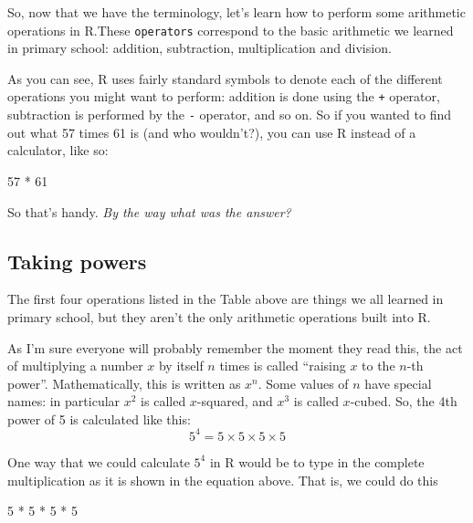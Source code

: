 \documentclass[
]{book}
\newenvironment{Shaded}{\begin{snugshade}}{\end{snugshade}}
\newcommand{\DecValTok}[1]{\textcolor[rgb]{0.00,0.00,0.81}{#1}}
\newcommand{\SpecialCharTok}[1]{\textcolor[rgb]{0.00,0.00,0.00}{#1}}
\begin{document}
So, now that we have the terminology, let's learn how to perform some arithmetic operations in R.These \texttt{operators} correspond to the basic arithmetic we learned in primary school: addition, subtraction, multiplication and division.

As you can see, R uses fairly standard symbols to denote each of the different operations you might want to perform: addition is done using the \texttt{+} operator, subtraction is performed by the \texttt{-} operator, and so on. So if you wanted to find out what 57 times 61 is (and who wouldn't?), you can use R instead of a calculator, like so:

\begin{Shaded}
\begin{Highlighting}[]
\DecValTok{57} \SpecialCharTok{*} \DecValTok{61}
\end{Highlighting}
\end{Shaded}

So that's handy. \emph{By the way what was the answer?}

\hypertarget{taking-powers}{%
\subsection{Taking powers}\label{taking-powers}}

The first four operations listed in the Table above are things we all learned in primary school, but they aren't the only arithmetic operations built into R.

As I'm sure everyone will probably remember the moment they read this, the act of multiplying a number \(x\) by itself \(n\) times is called ``raising \(x\) to the \(n\)-th power''. Mathematically, this is written as \(x^n\). Some values of \(n\) have special names: in particular \(x^2\) is called \(x\)-squared, and \(x^3\) is called \(x\)-cubed. So, the 4th power of 5 is calculated like this:
\[
5^4 = 5 \times 5 \times 5 \times 5 
\]

One way that we could calculate \(5^4\) in R would be to type in the complete multiplication as it is shown in the equation above. That is, we could do this

\begin{Shaded}
\begin{Highlighting}[]
\DecValTok{5} \SpecialCharTok{*} \DecValTok{5} \SpecialCharTok{*} \DecValTok{5} \SpecialCharTok{*} \DecValTok{5}
\end{Highlighting}
\end{Shaded}
\end{document}
